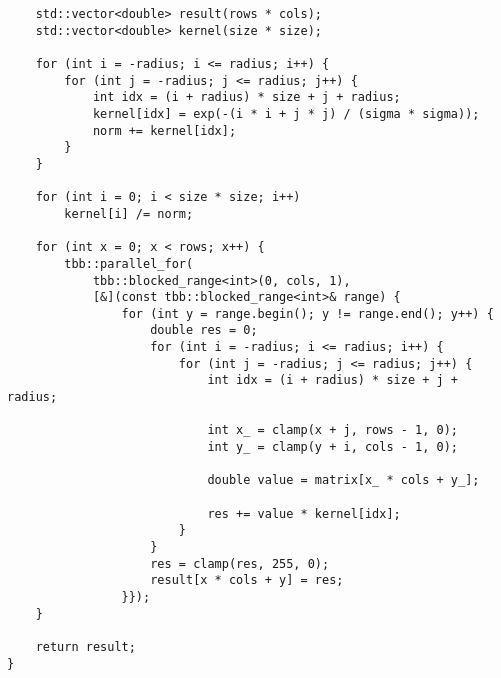 \documentclass{report}
\begin{document}
\begin{lstlisting}
    std::vector<double> result(rows * cols);
    std::vector<double> kernel(size * size);

    for (int i = -radius; i <= radius; i++) {
        for (int j = -radius; j <= radius; j++) {
            int idx = (i + radius) * size + j + radius;
            kernel[idx] = exp(-(i * i + j * j) / (sigma * sigma));
            norm += kernel[idx];
        }
    }

    for (int i = 0; i < size * size; i++)
        kernel[i] /= norm;

    for (int x = 0; x < rows; x++) {
        tbb::parallel_for(
            tbb::blocked_range<int>(0, cols, 1),
            [&](const tbb::blocked_range<int>& range) {
                for (int y = range.begin(); y != range.end(); y++) {
                    double res = 0;
                    for (int i = -radius; i <= radius; i++) {
                        for (int j = -radius; j <= radius; j++) {
                            int idx = (i + radius) * size + j + radius;

                            int x_ = clamp(x + j, rows - 1, 0);
                            int y_ = clamp(y + i, cols - 1, 0);

                            double value = matrix[x_ * cols + y_];

                            res += value * kernel[idx];
                        }
                    }
                    res = clamp(res, 255, 0);
                    result[x * cols + y] = res;
                }});
    }

    return result;
}

	
\end{lstlisting}
\end{document}
